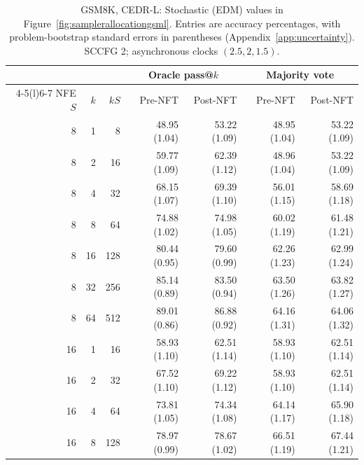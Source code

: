 \documentclass[11pt,letterpaper]{article}
\begin{document}
\begin{table}[p]
\centering\small
\setlength{\tabcolsep}{5pt}
\caption{GSM8K, CEDR-L: Stochastic (EDM) values in Figure~\ref{fig:samplerallocationgsml}. Entries are accuracy percentages, with problem-bootstrap standard errors in parentheses (Appendix~\ref{app:uncertainty}). SCCFG 2; asynchronous clocks $(2.5,2,1.5)$.}
\label{tab:samplerbudgetgsmledm}
\begin{tabular}{@{}rrr rrrr@{}}
\toprule
& & & \multicolumn{2}{c}{Oracle pass@$k$} & \multicolumn{2}{c}{Majority vote} \\
\cmidrule(lr){4-5}\cmidrule(l){6-7}
NFE $S$ & $k$ & $kS$ & Pre-NFT & Post-NFT & Pre-NFT & Post-NFT \\
\midrule
8 & 1 & 8 & 48.95 {\scriptsize (1.04)} & 53.22 {\scriptsize (1.09)} & 48.95 {\scriptsize (1.04)} & 53.22 {\scriptsize (1.09)} \\
8 & 2 & 16 & 59.77 {\scriptsize (1.09)} & 62.39 {\scriptsize (1.12)} & 48.96 {\scriptsize (1.04)} & 53.22 {\scriptsize (1.09)} \\
8 & 4 & 32 & 68.15 {\scriptsize (1.07)} & 69.39 {\scriptsize (1.10)} & 56.01 {\scriptsize (1.15)} & 58.69 {\scriptsize (1.18)} \\
8 & 8 & 64 & 74.88 {\scriptsize (1.02)} & 74.98 {\scriptsize (1.05)} & 60.02 {\scriptsize (1.19)} & 61.48 {\scriptsize (1.21)} \\
8 & 16 & 128 & 80.44 {\scriptsize (0.95)} & 79.60 {\scriptsize (0.99)} & 62.26 {\scriptsize (1.23)} & 62.99 {\scriptsize (1.24)} \\
8 & 32 & 256 & 85.14 {\scriptsize (0.89)} & 83.50 {\scriptsize (0.94)} & 63.50 {\scriptsize (1.26)} & 63.82 {\scriptsize (1.27)} \\
8 & 64 & 512 & 89.01 {\scriptsize (0.86)} & 86.88 {\scriptsize (0.92)} & 64.16 {\scriptsize (1.31)} & 64.06 {\scriptsize (1.32)} \\
\midrule
16 & 1 & 16 & 58.93 {\scriptsize (1.10)} & 62.51 {\scriptsize (1.14)} & 58.93 {\scriptsize (1.10)} & 62.51 {\scriptsize (1.14)} \\
16 & 2 & 32 & 67.52 {\scriptsize (1.10)} & 69.22 {\scriptsize (1.12)} & 58.93 {\scriptsize (1.10)} & 62.51 {\scriptsize (1.14)} \\
16 & 4 & 64 & 73.81 {\scriptsize (1.05)} & 74.34 {\scriptsize (1.08)} & 64.14 {\scriptsize (1.17)} & 65.90 {\scriptsize (1.18)} \\
16 & 8 & 128 & 78.97 {\scriptsize (0.99)} & 78.67 {\scriptsize (1.02)} & 66.51 {\scriptsize (1.19)} & 67.44 {\scriptsize (1.21)} \\

\end{tabular}
\end{table}
\end{document}
